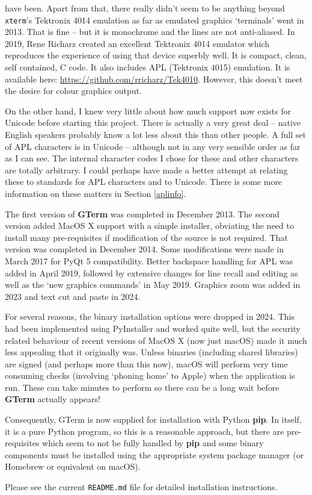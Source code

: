 \documentclass[a4paper,twoside,11pt]{article}
\newcommand{\newpara}{\par\vspace{4mm}\noindent}
\begin{document}
have been. Apart from that, there really didn't seem to be anything beyond \texttt{xterm}'s Tektronix 4014 emulation as far
as emulated graphics `terminals' went in 2013. That is fine -- but it is monochrome and the lines are not anti-aliased. In 2019,
Rene Richarz created an excellent Tektronix 4014 emulator which reproduces the experience of using that
device superbly well. It is compact, clean, self contained, C code. It also includes APL (Tektronix 4015) emulation.
It is available here: \url{https://github.com/rricharz/Tek4010}. However, this doesn't meet the desire for colour graphics
output.
\newpara
On the other hand, I knew very little about how much support now exists for Unicode before starting this project.
There is actually a very great deal -- native English speakers probably know a lot less about this than other people.
A full set of APL characters is in Unicode -- although not in any very sensible order as far as I can see. The
internal character codes I chose for these and other characters are totally arbitrary. I could perhaps have made a
better attempt at relating these to standards for APL characters and to Unicode. There is some more information
on these matters in Section \ref{aplinfo}.
\newpara
The first version of \textbf{GTerm} was completed in December 2013. The second version added MacOS X support with a 
simple installer, obviating the need to install many pre-requisites if modification of the source is not required.
That version was completed in December 2014. Some modifications were made in March 2017 for PyQt 5 compatibility.
Better backspace handling for APL was added in April 2019, followed by extensive changes for line recall and editing
as well as the `new graphics commands' in May 2019. Graphics zoom was added in 2023 and text cut and paste in 2024.
\newpara
For several reasons, the binary installation options were dropped in 2024. This had been implemented using PyInstaller and
worked quite well, but the security related behaviour of recent versions of MacOS X (now just macOS) made it much less
appealing that it originally was. Unless binaries (including shared libraries) are signed (and perhaps more than this now),
macOS will perform very time consuming checks (involving `phoning home' to Apple) when the application is run. These
can take minutes to perform so there can be a long wait before \textbf{GTerm} actually appears!
\newpara
Consequently, GTerm is now supplied for installation with Python \textbf{pip}. In itself, it is a pure Python program, so this is 
a reasonable approach, but there are pre-requisites which seem to not be fully handled by \textbf{pip} and some binary
components must be installed using the appropriate system package manager (or Homebrew or equivalent on macOS).
\newpara
Please see the current \texttt{README.md} file for detailed installation instructions.
\end{document}
